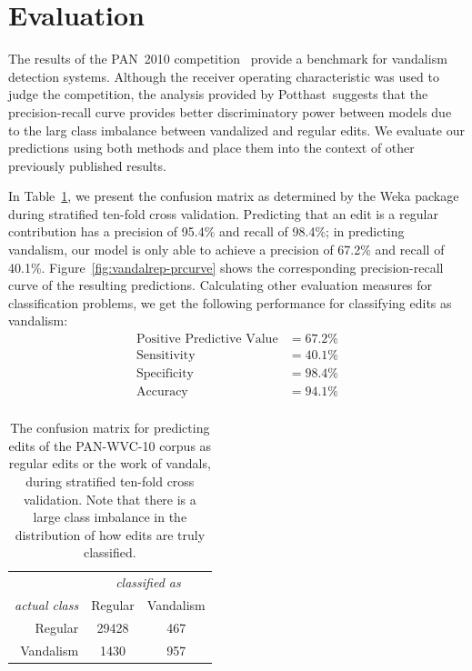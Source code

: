 \section{Evaluation}

The results of the PAN~2010 competition~\cite{Potthast2010b}
provide a benchmark for vandalism detection systems.
Although the receiver operating characteristic was used to judge the
competition, the analysis provided by Potthast~\etal suggests
that the precision-recall curve provides better discriminatory power
between models due to the larg
class imbalance between vandalized and regular edits.
We evaluate our predictions using both methods and place them into
the context of other previously published results.

In Table~\ref{tab:vandalrep-confusion}, we present the confusion matrix
as determined by the Weka package during stratified ten-fold cross
validation.
Predicting that an edit is a regular contribution has a
precision of 95.4\% and recall of 98.4\%;
in predicting vandalism, our model is only able
to achieve a precision of 67.2\% and recall of 40.1\%.
Figure~\ref{fig:vandalrep-prcurve} shows the corresponding
precision-recall curve of the resulting predictions.
Calculating other evaluation measures for classification problems, we get
the following performance for classifying edits as vandalism:
\begin{align*}
\text{Positive Predictive Value} &= 67.2\% \\
\text{Sensitivity} &= 40.1\% \\
\text{Specificity} &= 98.4\% \\
\text{Accuracy}    &= 94.1\% \\
\end{align*}

\begin{table}[t!]
  \begin{center}
    \begin{tabular}{| r | c c |}
      \hline
          & \multicolumn{2}{c|}{\textit{classified as}} \\
      \textit{actual class} & Regular & Vandalism \\
          \cline{2-3}
      Regular & 29428 & 467 \\
      Vandalism & 1430 & 957 \\
      \hline
    \end{tabular}
  \end{center}
  \caption[Confusion matrix for vandalism prediction]{%
    The confusion matrix for predicting edits of the PAN-WVC-10
    corpus as regular edits or the work of vandals,
    during stratified ten-fold cross validation.
    Note that there is a large class imbalance in the distribution
    of how edits are truly classified.}
  \label{tab:vandalrep-confusion}
\end{table}

